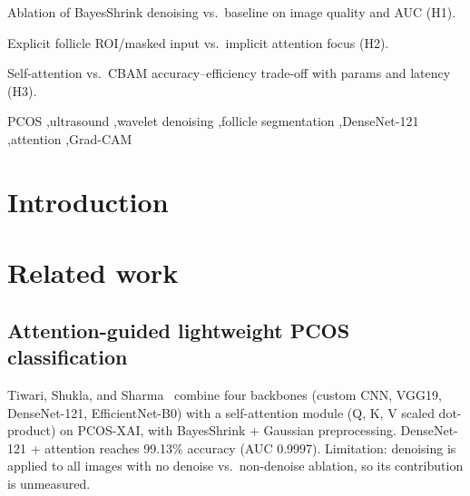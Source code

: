 \documentclass[a4paper,fleqn]{cas-sc}
\begin{document}
\begin{highlights}
\item Ablation of BayesShrink denoising vs.\ baseline on image quality and AUC (H1).
\item Explicit follicle ROI/masked input vs.\ implicit attention focus (H2).
\item Self-attention vs.\ CBAM accuracy--efficiency trade-off with params and latency (H3).
\end{highlights}

\begin{keywords}
PCOS \sep ultrasound \sep wavelet denoising \sep follicle segmentation \sep DenseNet-121 \sep attention \sep Grad-CAM
\end{keywords}

\maketitle

\section{Introduction}\label{sec:intro}

\section{Related work}\label{sec:related}
\subsection{Attention-guided lightweight PCOS classification}\label{sec:tiwari}
Tiwari, Shukla, and Sharma~\citep{Tiwari2026} combine four backbones (custom CNN, VGG19, DenseNet-121, EfficientNet-B0) with a self-attention module (Q, K, V scaled dot-product) on PCOS-XAI, with BayesShrink + Gaussian preprocessing. DenseNet-121 + attention reaches 99.13\% accuracy (AUC 0.9997). Limitation: denoising is applied to all images with no denoise vs.\ non-denoise ablation, so its contribution is unmeasured.
\end{document}
